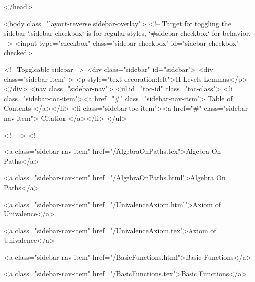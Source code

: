   
</head>




  <body class="layout-reverse sidebar-overlay">
    <!-- Target for toggling the sidebar `.sidebar-checkbox` is for regular
     styles, `#sidebar-checkbox` for behavior. -->
<input type="checkbox" class="sidebar-checkbox" id="sidebar-checkbox" checked>

<!-- Toggleable sidebar -->
<div class="sidebar" id="sidebar">
  <div class="sidebar-item" >
    <p style="text-decoration:left">H-Levels Lemmas</p>
  </div>
  <nav class="sidebar-nav">
    <ul id="toc-id" class="toc-class">
  <li class="sidebar-toc-item"><a href="#" class="sidebar-nav-item"> Table of Contents </a></li>
  <li class="sidebar-toc-item"><a href="#" class="sidebar-nav-item"> Citation </a></li>
</ul>


    <!--  -->
    <!-- 
      
    
      
    
      
    
      
        
      
    
      
        
          <a class="sidebar-nav-item" href="/AlgebraOnPaths.tex">Algebra On Paths</a>
        
      
    
      
        
          <a class="sidebar-nav-item" href="/AlgebraOnPaths.html">Algebra On Paths</a>
        
      
    
      
        
          <a class="sidebar-nav-item" href="/UnivalenceAxiom.html">Axiom of Univalence</a>
        
      
    
      
        
          <a class="sidebar-nav-item" href="/UnivalenceAxiom.tex">Axiom of Univalence</a>
        
      
    
      
        
          <a class="sidebar-nav-item" href="/BasicFunctions.html">Basic Functions</a>
        
      
    
      
        
          <a class="sidebar-nav-item" href="/BasicFunctions.tex">Basic Functions</a>
        
      
    
